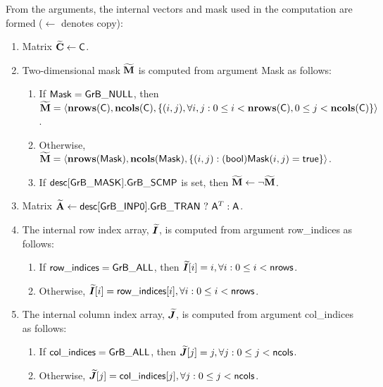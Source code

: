 From the arguments, the internal vectors and mask used in 
the computation are formed ($\leftarrow$ denotes copy):
\begin{enumerate}
	\item Matrix ${\bf \widetilde{C}} \leftarrow {\sf C}$.

	\item Two-dimensional mask ${\bf \widetilde{M}}$ is computed from 
    argument {\sf Mask} as follows:
	\begin{enumerate}

		\item	If ${\sf Mask} = {\sf GrB\_NULL}$, then ${\bf \widetilde{M}} = 
        \langle \bold{nrows}({\sf C}), \bold{ncols}({\sf C}), \{(i,j), 
        \forall i,j : 0 \leq i <  \bold{nrows}({\sf C}), 0 \leq j < 
        \bold{ncols}({\sf C}) \} \rangle$.

		\item	Otherwise, ${\bf \widetilde{M}} = \langle 
        \bold{nrows}({\sf Mask}), \bold{ncols}({\sf Mask}), \{(i,j) : 
        ({\sf bool}){\sf Mask}(i,j) = {\sf true}\} \rangle$.

		\item	If ${\sf desc[GrB\_MASK].GrB\_SCMP}$ is set, then 
        ${\bf \widetilde{M}} \leftarrow \neg {\bf \widetilde{M}}$.

	\end{enumerate}

	\item Matrix ${\bf \widetilde{A}} \leftarrow 
    {\sf desc[GrB\_INP0].GrB\_TRAN} \ ? \ {\sf A}^T : {\sf A}$.

    \item The internal row index array, $\bm{\widetilde{I}}$, is computed from 
    argument {\sf row\_indices} as follows:
	\begin{enumerate}
		\item	If ${\sf row\_indices} = {\sf GrB\_ALL}$, then 
        $\bm{\widetilde{I}}[i] = i, \forall i : 0 \leq i < {\sf nrows}$.

		\item	Otherwise, $\bm{\widetilde{I}}[i] = {\sf row\_indices}[i], 
        \forall i : 0 \leq i < {\sf nrows}$.
    \end{enumerate}
    
    \item The internal column index array, $\bm{\widetilde{J}}$, is computed from 
    argument {\sf col\_indices} as follows:
	\begin{enumerate}
		\item	If ${\sf col\_indices} = {\sf GrB\_ALL}$, then 
        $\bm{\widetilde{J}}[j] = j, \forall j : 0 \leq j < {\sf ncols}$.

		\item	Otherwise, $\bm{\widetilde{J}}[j] = {\sf col\_indices}[j], 
        \forall j : 0 \leq j < {\sf ncols}$.
    \end{enumerate}
\end{enumerate}

